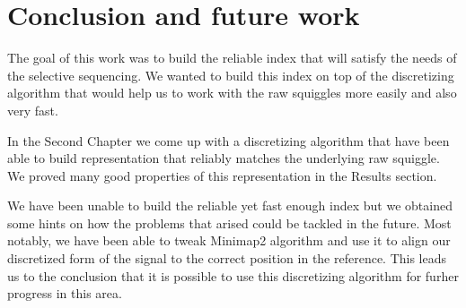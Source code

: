 \chapter*{Conclusion and future work}  %

\label{kap:conclusionAndFuture}

The goal of this work was to build the reliable index that will satisfy the needs
of the selective sequencing. We wanted to build this index on top of the discretizing
algorithm that would help us to work with the raw squiggles more easily and also
very fast.

In the Second Chapter we come up with a discretizing algorithm that have been able
to build representation that reliably matches the underlying raw squiggle. We proved
many good properties of this representation in the Results section.

We have been unable to build the reliable yet fast enough index but we obtained
some hints on how the problems that arised could be tackled in the future.
Most notably, we have been able to tweak Minimap2 algorithm and use it to align our discretized form of the
signal to the correct position in the reference. This leads us to the conclusion that
it is possible to use this discretizing algorithm for furher progress in this area.


